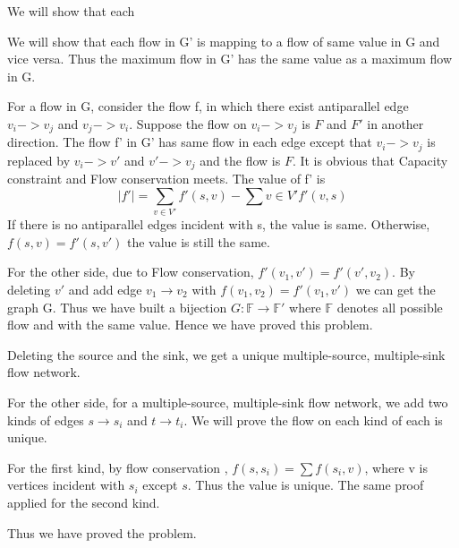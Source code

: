 \pshw
\begin{psproblem}[26.1.1]
    We will show that each
\end{psproblem}
\begin{pssolution}
    We will show that each flow in G' is mapping to a flow of same value in G and vice versa. Thus the maximum flow in G' has the same value as a maximum flow in G.

    For a flow in G, consider the flow f, in which there exist antiparallel edge $v_i->v_j$ and $v_j->v_i$. Suppose the flow on $v_i->v_j$ is $F$ and $F'$ in another direction. The flow f' in G' has same flow in each edge except that $v_i->v_j$ is replaced by $v_i->v'$ and $v'->v_j$ and the flow is $F$. It is obvious that Capacity constraint and Flow conservation meets. The value of f' is 
        $$|f'|=\sum_{v\in V'}f'(s,v)-\sum{v\in V'}f'(v,s)$$ 
    If there is no antiparallel edges incident with s, the value is same. Otherwise, $f(s,v)=f'(s,v')$ the value is still the same.

    For the other side, due to Flow conservation, $f'(v_1,v')=f'(v',v_2)$. By deleting $v'$ and add edge $v_1\rightarrow v_2$ with $f(v_1,v_2)=f'(v_1,v')$ we can get the graph G. Thus we have built a bijection $G:\mathbb{F}\rightarrow\mathbb{F'}$ where $\mathbb{F}$ denotes all possible flow and with the same value. Hence we have proved this problem.
\end{pssolution}

\begin{psproblem}[26.1.2]
\end{psproblem}
\begin{pssolution}
    Deleting the source and the sink, we get a unique multiple-source, multiple-sink flow network.

    For the other side, for a multiple-source, multiple-sink flow network, we add two kinds of edges $s\rightarrow s_i$ and $t\rightarrow t_i$. We will prove the flow on each kind of each is unique.
    
    For the first kind, by flow conservation , $f(s, s_i)=\sum f(s_i, v)$, where v is vertices incident with $s_i$ except $s$. Thus the value is unique. The same proof applied for the second kind.

    Thus we have proved the problem.
\end{pssolution}

